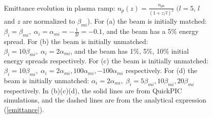 \documentclass[%
reprint, superscriptaddress,
 amsmath,amssymb, aps,
prstab,
]{revtex4-2}
\begin{document}
\begin{figure}[!ht]
   \centering
   \quad
   \\
   \quad
   \caption{Emittance evolution in plasma ramp: $n_p(z) =
        \frac{n_{p0}}{(1+z/l)^2}$ $(l = 5$, $l$ and $z$ are normalized
        to $\beta_{mi}$). For (a) the
        beam is initially matched: $\beta_i = \beta_{mi},\;\alpha_i =
        \alpha_{mi} = -\frac{1}{2l} = -0.1 $, and the beam has a 5\% energy spread. For (b) the beam is initially unmatched: $\beta_i
        =10 \beta_{mi},\;\alpha_i =2 \alpha_{mi}$, and the beam has 1\%, 5\%, 10\% initial energy spreads respectively. For (c) the
        beam is initially unmatched: $\beta_i = 10\beta_{mi},\;\alpha_i =
        2\alpha_{mi}, 100\alpha_{mi}, -100\alpha_{mi}$ respectively. For (d) the beam is initially unmatched: $\alpha_i =2 \alpha_{mi}, \; \beta_i
        =5 \beta_{mi},10 \beta_{mi}, 20 \beta_{mi}$ respectively. In (b)(c)(d), the solid lines are from QuickPIC simulations, and the dashed lines are from the analytical expression (\ref{emittance}).}
   \label{fig:emittance evolution in ramp}
\end{figure}
\end{document}
